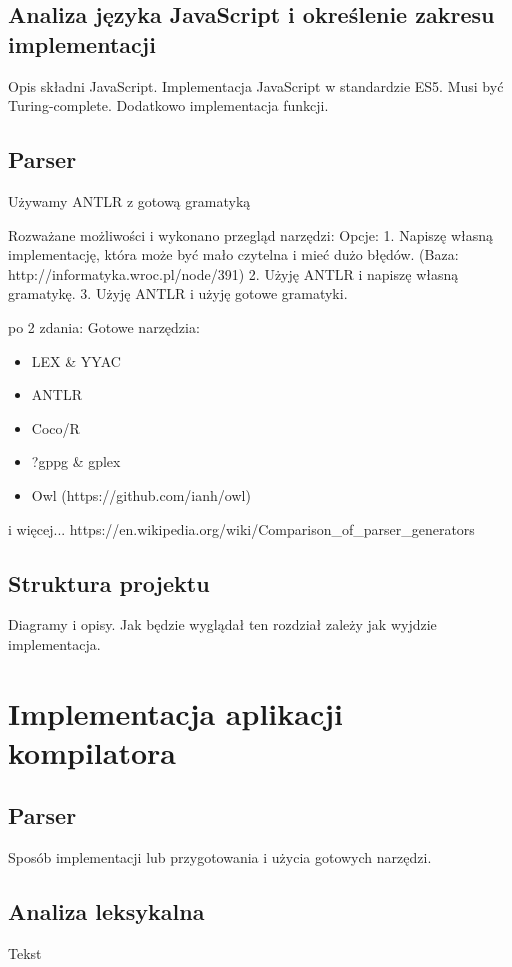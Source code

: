 \documentclass[a4paper]{article}
\begin{document}
\subsection{Analiza języka JavaScript i określenie zakresu implementacji}
Opis składni JavaScript.
Implementacja JavaScript w standardzie ES5.
Musi być Turing-complete. Dodatkowo implementacja funkcji.

\subsection{Parser}
Używamy ANTLR z gotową gramatyką

Rozważane możliwości i wykonano przegląd narzędzi:
Opcje:
1. Napiszę własną implementację, która może być mało czytelna i mieć dużo błędów. (Baza: http://informatyka.wroc.pl/node/391)
2. Użyję ANTLR i napiszę własną gramatykę.
3. Użyję ANTLR i użyję gotowe gramatyki.

po 2 zdania: 
Gotowe narzędzia:
\begin{itemize}
  \item LEX \& YYAC
  \item ANTLR
  \item Coco/R
  \item ?gppg \& gplex
  \item Owl (https://github.com/ianh/owl)
\end{itemize}
i więcej... https://en.wikipedia.org/wiki/Comparison\_of\_parser\_generators


\subsection{Struktura projektu}
Diagramy i opisy.
Jak będzie wyglądał ten rozdział zależy jak wyjdzie implementacja.

\section{Implementacja aplikacji kompilatora}
\subsection{Parser}
Sposób implementacji lub przygotowania i użycia gotowych narzędzi.

\subsection{Analiza leksykalna}
Tekst
\end{document}
